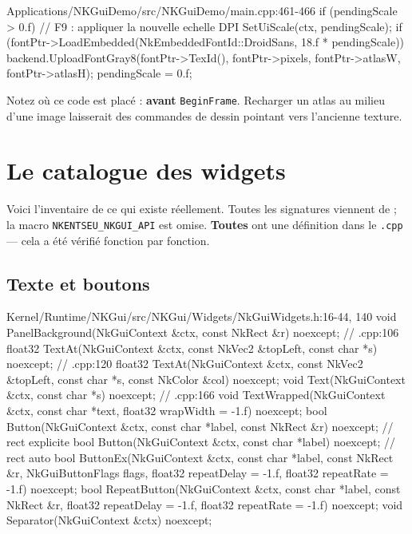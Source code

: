 \begin{nkcode}{Applications/NKGuiDemo/src/NKGuiDemo/main.cpp:461-466}
        if (pendingScale > 0.f) { // F9 : appliquer la nouvelle echelle DPI
            SetUiScale(ctx, pendingScale);
            if (fontPtr->LoadEmbedded(NkEmbeddedFontId::DroidSans, 18.f * pendingScale))
                backend.UploadFontGray8(fontPtr->TexId(), fontPtr->pixels, fontPtr->atlasW, fontPtr->atlasH);
            pendingScale = 0.f;
        }
\end{nkcode}

Notez où ce code est placé : \textbf{avant} \texttt{BeginFrame}. Recharger un
atlas au milieu d'une image laisserait des commandes de dessin pointant vers
l'ancienne texture.

\section{Le catalogue des widgets}

Voici l'inventaire de ce qui existe réellement. Toutes les signatures viennent de
 ; la macro
\texttt{NKENTSEU\_NKGUI\_API} est omise. \textbf{Toutes} ont une définition dans
le \texttt{.cpp} — cela a été vérifié fonction par fonction.

\subsection{Texte et boutons}

\begin{nkcode}{Kernel/Runtime/NKGui/src/NKGui/Widgets/NkGuiWidgets.h:16-44, 140}
void    PanelBackground(NkGuiContext &ctx, const NkRect &r) noexcept;                      // .cpp:106
float32 TextAt(NkGuiContext &ctx, const NkVec2 &topLeft, const char *s) noexcept;          // .cpp:120
float32 TextAt(NkGuiContext &ctx, const NkVec2 &topLeft, const char *s, const NkColor &col) noexcept;
void    Text(NkGuiContext &ctx, const char *s) noexcept;                                   // .cpp:166
void    TextWrapped(NkGuiContext &ctx, const char *text, float32 wrapWidth = -1.f) noexcept;
bool    Button(NkGuiContext &ctx, const char *label, const NkRect &r) noexcept;            // rect explicite
bool    Button(NkGuiContext &ctx, const char *label) noexcept;                             // rect auto
bool    ButtonEx(NkGuiContext &ctx, const char *label, const NkRect &r, NkGuiButtonFlags flags,
                 float32 repeatDelay = -1.f, float32 repeatRate = -1.f) noexcept;
bool    RepeatButton(NkGuiContext &ctx, const char *label, const NkRect &r,
                     float32 repeatDelay = -1.f, float32 repeatRate = -1.f) noexcept;
void    Separator(NkGuiContext &ctx) noexcept;
\end{nkcode}

